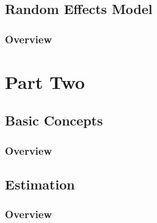 \documentclass[11pt,fleqn]{book} %
\begin{document}

\chapter{Random Effects Model}

\section{Overview}




 \part{Part Two}



\chapter{Basic Concepts}

\section{Overview}




\chapter{Estimation}

\section{Overview}
\end{document}
